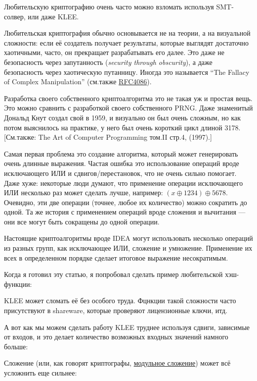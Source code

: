 Любительскую криптографию очень часто можно взломать используя SMT-солвер, или даже KLEE.

Любительская криптография обычно основывается не на теории, а на визуальной сложности:
если её создатель получает результаты, которые выглядят достаточно хаотичными, часто, он прекращает разрабатывать его далее.
Это даже не безопасность через запутанность (\textit{security through obscurity}),
а даже безопасность через хаотическую путанницу.
Иногда это называется ``The Fallacy of Complex Manipulation''
(см.также \href{https://tools.ietf.org/html/rfc4086}{RFC4086}).

Разработка своего собственного криптоалгоритма это не такая уж и простая вещь.
Это можно сравнить с разработкой своего собственного \ac{PRNG}.
Даже знаменитый Дональд Кнут создал свой в 1959, и визуально он был очень сложным,
но как потом выяснилось на практике, у него был очень короткий цикл длиной 3178.
[См.также: The Art of Computer Programming том.II стр.4, (1997).]

Самая первая проблема это создание алгоритма, который может генерировать очень длинные выражения.
Частая ошибка это использование операций вроде исключающего ИЛИ и сдвигов/перестановок, что не очень сильно помогает.
Даже хуже: некоторые люди думают, что применение операции исключающего ИЛИ несколько раз может сделать лучше,
например: $(x \oplus 1234) \oplus 5678$.
Очевидно, эти две операции (точнее, любое их количество) можно сократить до одной.
Та же история с применением операций вроде сложения и вычитания --- они все могут быть сокращены до одной операции.

Настоящие криптоалгоритмы вроде IDEA могут использовать несколько операций из разных групп, как исключающее ИЛИ,
сложение и умножение.
Применение их всех в определенном порядке сделает итоговое выражение несократимым.

Когда я готовил эту статью, я попробовал сделать пример любительской хэш-функции:



KLEE может сломать её без особого труда.
Фцнкции такой сложности часто присутствуют в shareware, которые проверяют лицензионные ключи, итд.

А вот как мы можем сделать работу KLEE труднее используя сдвиги, зависимые от входов,
и это делает количество возможных входных значений намного больше:



Сложение (или, как говорят криптографы, \href{https://yurichev.com/blog/modulo/}{модульное сложение}) может всё усложнить
еще сильнее:

